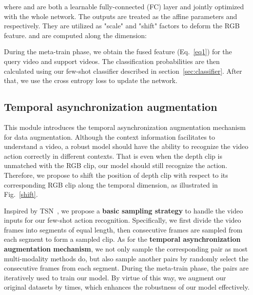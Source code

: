\documentclass[sigconf]{acmart}
\begin{document}
	\noindent where  and   
	are both a learnable fully-connected (FC) layer and jointly optimized with the whole network. 
	The outputs are treated as the affine parameters  and  respectively. 
	They are utilized as "scale" and "shift" factors to deform the RGB feature. 
	 and  are computed along the  dimension:
	
	
	
	
	
	During the meta-train phase, we obtain the fused feature (Eq.~\ref{eq1}) for the query video and support videos. 
	The classification probabilities are then calculated using our few-shot classifier described in section~\ref{sec:classifier}.
	After that, we use the cross entropy loss to update the network. 
	
	
	
	
	
	
	\subsection{Temporal asynchronization augmentation \label{section:shift}}
	This module introduces the temporal asynchronization augmentation mechanism for data augmentation. 
	Although the context information facilitates to understand a video, a robust model should have the ability to recognize the video action correctly in different contexts. 
	That is even when the depth clip is unmatched with the RGB clip, our model should still recognize the action. Therefore, we propose to shift the position of depth clip with respect to its corresponding RGB clip along the temporal dimension, as illustrated in Fig.~\ref{shift}.
	
	
	Inspired by TSN~\cite{wang2016temporal}, we propose a \textbf{basic sampling strategy} to handle the video inputs for our few-shot action recognition.	Specifically, we first divide the video frames into  segments of equal length, then  consecutive frames are sampled from each segment to form a sampled clip. As for the \textbf{temporal asynchronization augmentation mechanism}, we not only sample the corresponding  pair as most multi-modality methods do, but also sample another  pairs by randomly select the  consecutive frames from each segment. During the meta-train phase, the  pairs are iteratively used to train our model.  By virtue of this way, we augment our original datasets by  times, which enhances the robustness of our model effectively.
	
	
	
	
	
	
	
\end{document}
